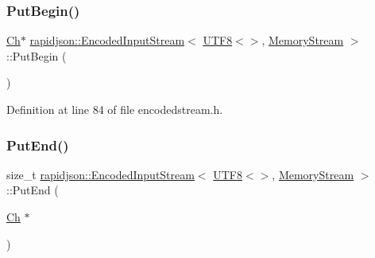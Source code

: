 \subsubsection{\texorpdfstring{PutBegin()}{PutBegin()}}
{\footnotesize\ttfamily \mbox{\hyperlink{classrapidjson_1_1_encoded_input_stream_3_01_u_t_f8_3_4_00_01_memory_stream_01_4_a907f1851cfe76ae1c3eb9e2074bfa507}{Ch}}$\ast$ \mbox{\hyperlink{classrapidjson_1_1_encoded_input_stream}{rapidjson\+::\+Encoded\+Input\+Stream}}$<$ \mbox{\hyperlink{structrapidjson_1_1_u_t_f8}{U\+T\+F8}}$<$$>$, \mbox{\hyperlink{structrapidjson_1_1_memory_stream}{Memory\+Stream}} $>$\+::Put\+Begin (\begin{DoxyParamCaption}{ }\end{DoxyParamCaption})}



Definition at line 84 of file encodedstream.\+h.


\begin{DoxyCode}{0}

\end{DoxyCode}
\mbox{\label{classrapidjson_1_1_encoded_input_stream_3_01_u_t_f8_3_4_00_01_memory_stream_01_4_a954a2404a0b4419ada15d85f87e857c7}} 
\subsubsection{\texorpdfstring{PutEnd()}{PutEnd()}}
{\footnotesize\ttfamily size\+\_\+t \mbox{\hyperlink{classrapidjson_1_1_encoded_input_stream}{rapidjson\+::\+Encoded\+Input\+Stream}}$<$ \mbox{\hyperlink{structrapidjson_1_1_u_t_f8}{U\+T\+F8}}$<$$>$, \mbox{\hyperlink{structrapidjson_1_1_memory_stream}{Memory\+Stream}} $>$\+::Put\+End (\begin{DoxyParamCaption}\item[{\mbox{\hyperlink{classrapidjson_1_1_encoded_input_stream_3_01_u_t_f8_3_4_00_01_memory_stream_01_4_a907f1851cfe76ae1c3eb9e2074bfa507}{Ch}} $\ast$}]{ }\end{DoxyParamCaption})}



